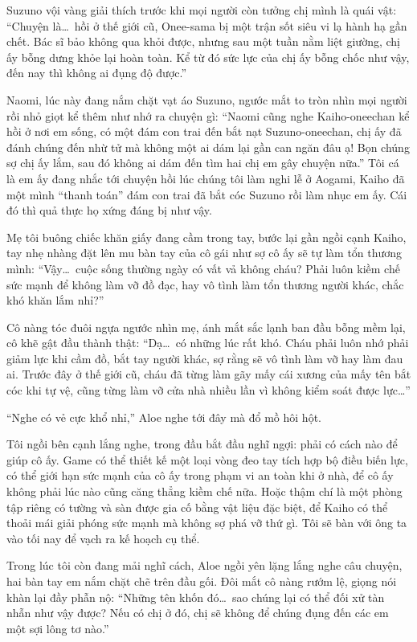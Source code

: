 ﻿\documentclass[../main.tex]{subfiles}
\begin{document}
Suzuno vội vàng giải thích trước khi mọi người còn tưởng chị mình là quái vật: ``Chuyện là\dots\ hồi ở thế giới cũ, Onee-sama bị một trận sốt siêu vi lạ hành hạ gần chết. Bác sĩ bảo không qua khỏi được, nhưng sau một tuần nằm liệt giường, chị ấy bỗng dưng khỏe lại hoàn toàn. Kể từ đó sức lực của chị ấy bỗng chốc như vậy, đến nay thì không ai đụng độ được.''

Naomi, lúc này đang nắm chặt vạt áo Suzuno, ngước mắt to tròn nhìn mọi người rồi nhỏ giọt kể thêm như nhớ ra chuyện gì: ``Naomi cũng nghe Kaiho-oneechan kể hồi ở nơi em sống, có một đám con trai đến bắt nạt Suzuno-oneechan, chị ấy đã đánh chúng đến nhừ tử mà không một ai dám lại gần can ngăn đâu ạ! Bọn chúng sợ chị ấy lắm, sau đó không ai dám đến tìm hai chị em gây chuyện nữa.'' Tôi cá là em ấy đang nhắc tới chuyện hồi lúc chúng tôi làm nghi lễ ở Aogami, Kaiho đã một mình ``thanh toán'' đám con trai đã bắt cóc Suzuno rồi làm nhục em ấy. Cái đó thì quả thực họ xứng đáng bị như vậy.

Mẹ tôi buông chiếc khăn giấy đang cầm trong tay, bước lại gần ngồi cạnh Kaiho, tay nhẹ nhàng đặt lên mu bàn tay của cô gái như sợ cô ấy sẽ tự làm tổn thương mình: ``Vậy\dots\ cuộc sống thường ngày có vất vả không cháu? Phải luôn kiềm chế sức mạnh để không làm vỡ đồ đạc, hay vô tình làm tổn thương người khác, chắc khó khăn lắm nhỉ?''

Cô nàng tóc đuôi ngựa ngước nhìn mẹ, ánh mắt sắc lạnh ban đầu bỗng mềm lại, cô khẽ gật đầu thành thật: ``Dạ\dots\ có những lúc rất khó. Cháu phải luôn nhớ phải giảm lực khi cầm đồ, bắt tay người khác, sợ rằng sẽ vô tình làm vỡ hay làm đau ai. Trước đây ở thế giới cũ, cháu đã từng làm gãy mấy cái xương của mấy tên bắt cóc khi tự vệ, cũng từng làm vỡ cửa nhà nhiều lần vì không kiểm soát được lực\dots''

``Nghe có vẻ cực khổ nhỉ,'' Aloe nghe tới đây mà đổ mồ hôi hột.

Tôi ngồi bên cạnh lắng nghe, trong đầu bắt đầu nghĩ ngợi: phải có cách nào để giúp cô ấy. Game có thể thiết kế một loại vòng đeo tay tích hợp bộ điều biến lực, có thể giới hạn sức mạnh của cô ấy trong phạm vi an toàn khi ở nhà, để cô ấy không phải lúc nào cũng căng thẳng kiềm chế nữa. Hoặc thậm chí là một phòng tập riêng có tường và sàn được gia cố bằng vật liệu đặc biệt, để Kaiho có thể thoải mái giải phóng sức mạnh mà không sợ phá vỡ thứ gì. Tôi sẽ bàn với ông ta vào tối nay để vạch ra kế hoạch cụ thể.

Trong lúc tôi còn đang mải nghĩ cách, Aloe ngồi yên lặng lắng nghe câu chuyện, hai bàn tay em nắm chặt chẽ trên đầu gối. Đôi mắt cô nàng rướm lệ, giọng nói khàn lại đầy phẫn nộ: ``Những tên khốn đó\dots\ sao chúng lại có thể đối xử tàn nhẫn như vậy được? Nếu có chị ở đó, chị sẽ không để chúng đụng đến các em một sợi lông tơ nào.''
\end{document}
